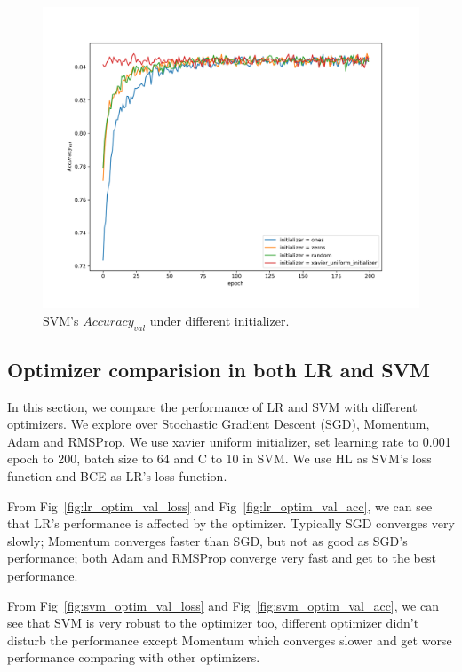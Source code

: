 \documentclass[journal, a4paper]{IEEEtran}
\begin{document}
\begin{figure}[!hbt]
	\begin{center}
		\includegraphics[width=\columnwidth]{svm_init_val_acc}
		\caption{SVM's $Accuracy_{val}$ under different initializer.}
		\label{fig:svm_init_val_acc}
	\end{center}
\end{figure} \par

\subsection{Optimizer comparision in both LR and SVM}
In this section, we compare the performance of LR and SVM with different optimizers. We explore over Stochastic Gradient Descent (SGD), Momentum, Adam and RMSProp. We use xavier uniform initializer, set learning rate to 0.001 epoch to 200, batch size to 64 and C to 10 in SVM. We use HL as SVM's loss function and BCE as LR's loss function.\par
From Fig~\ref{fig:lr_optim_val_loss} and Fig~\ref{fig:lr_optim_val_acc}, we can see that LR's performance is affected by the optimizer. Typically SGD converges very slowly; Momentum converges faster than SGD, but not as good as SGD's performance; both Adam and RMSProp converge very fast and get to the best performance.\par
From Fig~\ref{fig:svm_optim_val_loss} and Fig~\ref{fig:svm_optim_val_acc}, we can see that SVM is very robust to the optimizer too, different optimizer didn't disturb the performance except Momentum which converges slower and get worse performance comparing with other optimizers. \par
\end{document}
